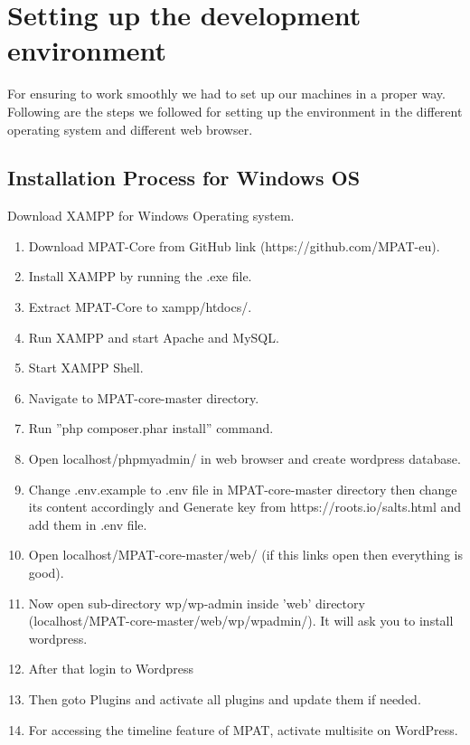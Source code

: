 \section{\textbf{Setting up the development environment }}\label{sec:relatedwork}


For ensuring to work smoothly we had to set up our
machines in a proper way. Following are the steps we followed
for setting up the environment in the different operating system
and different web browser.


\subsection{Installation Process for Windows OS}
 Download XAMPP for Windows Operating system.

 
\begin{enumerate}

 \item Download MPAT-Core from GitHub link
(https://github.com/MPAT-eu).
 \item Install XAMPP by running the .exe file.
\item Extract MPAT-Core to xampp/htdocs/.
\item Run XAMPP and start Apache and MySQL.
\item Start XAMPP Shell.
\item Navigate to MPAT-core-master directory.
\item Run ”php composer.phar install” command.
\item Open localhost/phpmyadmin/ in web browser and create
wordpress database.
\item Change .env.example to .env file in MPAT-core-master
directory then change its content accordingly and Generate
key from https://roots.io/salts.html and add them
in .env file.
\item Open localhost/MPAT-core-master/web/ (if this links
open then everything is good).
\item Now open sub-directory wp/wp-admin inside ’web’
directory (localhost/MPAT-core-master/web/wp/wpadmin/).
It will ask you to install wordpress.
\item After that login to Wordpress
\item Then goto Plugins and activate all plugins and update
them if needed.
\item For accessing the timeline feature of MPAT, activate
multisite on WordPress.
\end{enumerate}
 

